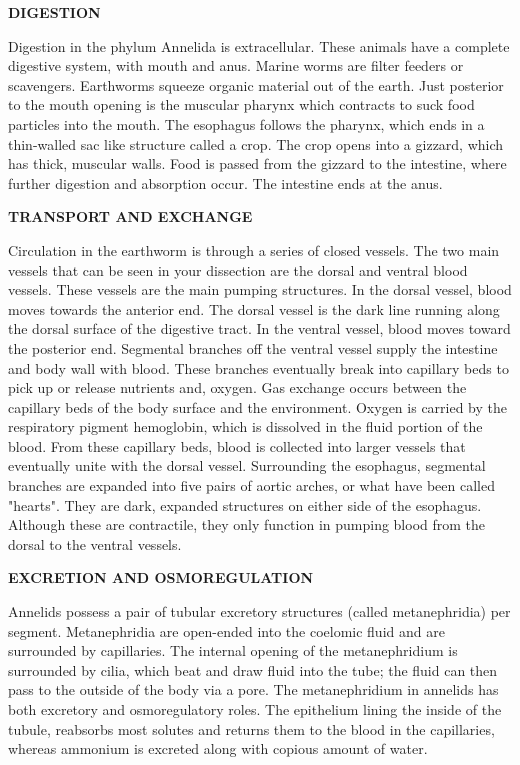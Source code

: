 \documentclass[
]{book}
\begin{document}
\textbf{DIGESTION}

Digestion in the phylum Annelida is extracellular. These animals have a complete digestive system, with mouth and anus. Marine worms are filter feeders or scavengers. Earthworms squeeze organic material out of the earth. Just posterior to the mouth opening is the muscular pharynx which contracts to suck food particles into the mouth. The esophagus follows the pharynx, which ends in a thin-walled sac like structure called a crop. The crop opens into a
gizzard, which has thick, muscular walls. Food is passed from the gizzard to the intestine, where
further digestion and absorption occur. The intestine ends at the anus.

\textbf{TRANSPORT AND EXCHANGE}

Circulation in the earthworm is through a series of closed vessels. The two main vessels that can
be seen in your dissection are the dorsal and ventral blood vessels. These vessels are the main
pumping structures. In the dorsal vessel, blood moves towards the anterior end. The dorsal vessel
is the dark line running along the dorsal surface of the digestive tract. In the ventral vessel, blood
moves toward the posterior end. Segmental branches off the ventral vessel supply the intestine
and body wall with blood. These branches eventually break into capillary beds to pick up or
release nutrients and, oxygen. Gas exchange occurs between the capillary beds of the body
surface and the environment. Oxygen is carried by the respiratory pigment hemoglobin, which is
dissolved in the fluid portion of the blood. From these capillary beds, blood is collected into larger
vessels that eventually unite with the dorsal vessel. Surrounding the esophagus, segmental branches are expanded into five pairs of aortic arches, or what have been called "hearts". They are dark, expanded structures on either side of the esophagus. Although these are contractile, they only function in pumping blood from the dorsal to the ventral vessels.

\textbf{EXCRETION AND OSMOREGULATION}

Annelids possess a pair of tubular excretory structures (called metanephridia) per segment.
Metanephridia are open-ended into the coelomic fluid and are surrounded by capillaries. The internal opening of the metanephridium is surrounded by cilia, which beat and draw fluid into the tube; the fluid can then pass to the outside of the body via a pore. The metanephridium in annelids has both excretory and osmoregulatory roles. The epithelium lining the inside of the tubule, reabsorbs most solutes and returns them to the blood in the capillaries, whereas ammonium is excreted along with copious amount of water.
\end{document}

